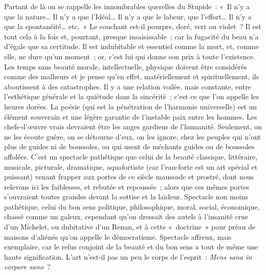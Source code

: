 \documentclass[french,twoside]{book} %
\begin{document}
Partant de là on se rappelle les innombrables querelles du Stupide : « Il n’y a que la nature… Il n’y a que l’Idéal… Il n’y a que le labeur, que l’effort… Il n’y a que la spontanéité… etc. » Le couchant est-il pourpre, doré, vert ou violet ? Il est tout cela à la fois et, pourtant, presque insaisissable ; car la fugacité du beau n’a d’égale que sa certitude. Il est indubitable et essentiel comme la mort, et, comme elle, ne dure qu’un moment ; or, c’est lui qui donne son prix à toute l’existence. Les temps sans beauté morale, intellectuelle, physique doivent être considérés comme des malheurs et je pense qu’en effet, matériellement et spirituellement, ils aboutissent à des catastrophes. Il y a une relation voilée, mais constante, entre l’esthétique générale et la quiétude dans la sincérité ; c’est ce que l’on appelle les heures dorées. La poésie (qui est la pénétration de l’harmonie universelle) est un élément souverain et une légère garantie de l’instable paix entre les hommes. Les chefs-d’œuvre vrais devraient être les anges gardiens de l’humanité. Seulement, on ne les écoute guère, on se détourne d’eux, on les ignore, chez les peuples qui n’ont plus de guides ni de boussoles, ou qui usent de méchants guides ou de boussoles affolées. C’est un spectacle pathétique que celui de la beauté classique, littéraire, musicale, picturale, dramatique, aquafortiste (car l’eau-forte est un art spécial et puissant) venant frapper aux portes de ce siècle maussade et prostré, dont nous relevons ici les faiblesses, et rebutée et repoussée ; alors que ces mêmes portes s’ouvraient toutes grandes devant la sottise et la laideur. Spectacle non moins pathétique, celui du bon sens politique, philosophique, moral, social, économique, chassé comme un galeux, cependant qu’on dressait des autels à l’insanité crue d’un Michelet, ou dubitative d’un Renan, et à cette « doctrine » pour préau de maisons d’aliénés qu’on appelle le démocratisme. Spectacle affreux, mais exemplaire, car le refus conjoint de la beauté et du bon sens a tout de même une haute signification. L’art n’est-il pas un peu le corps de l’esprit : {\itshape Mens sana in corpore sano} ?\par
\end{document}
